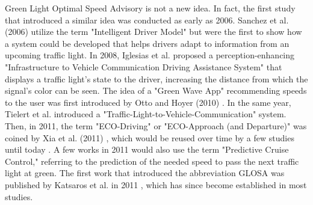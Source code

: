 Green Light Optimal Speed Advisory is not a new idea. In fact, the first study that introduced a similar idea was conducted as early as 2006. Sanchez et al. (2006) \cite{sanchez_predicting_2006} utilize the term "Intelligent Driver Model" but were the first to show how a system could be developed that helps drivers adapt to information from an upcoming traffic light. In 2008, Iglesias et al. \cite{iglesias_i2v_2008} proposed a perception-enhancing "Infrastructure to Vehicle Communication Driving Assistance System" that displays a traffic light's state to the driver, increasing the distance from which the signal's color can be seen. The idea of a "Green Wave App" recommending speeds to the user was first introduced by Otto and Hoyer (2010) \cite{otto_operating_2010}. In the same year, Tielert et al. \cite{tielert_impact_2010} introduced a "Traffic-Light-to-Vehicle-Communication" system. Then, in 2011, the term "ECO-Driving" or "ECO-Approach (and Departure)" was coined by Xia et al. (2011) \cite{xia_indirect_2011}, which would be reused over time by a few studies until today \cite{rakha_eco-driving_2011, rakha_aeris_2012, xia_field_2012, hao_eco-approach_2019, hu_lane-level_2023}. A few works in 2011 \cite{asadi_predictive_2011, raubitschek_predictive_2011} would also use the term "Predictive Cruise Control," referring to the prediction of the needed speed to pass the next traffic light at green. The first work that introduced the abbreviation GLOSA was published by Katsaros et al. in 2011 \cite{katsaros_performance_2011}, which has since become established in most studies.

